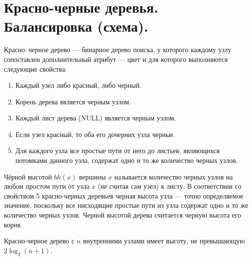 \section{Красно-черные деревья. Балансировка (схема).}

\begin{definition}
    Красно–черное дерево --- бинарное дерево поиска, у которого каждому узлу сопоставлен дополнительный атрибут --- цвет и для которого выполняются следующие свойства:

    \begin{enumerate}
        \item Каждый узел либо красный, либо черный.
        \item Корень дерева является черным узлом.
        \item Каждый лист дерева (NULL) является черным узлом.
        \item Если узел красный, то оба его дочерних узла черные.
        \item Для каждого узла все простые пути от него до листьев, являющихся потомками данного узла, содержат одно и то же количество черных узлов.
    \end{enumerate}
\end{definition}


\begin{definition}
    Чёрной высотой $bh(x)$ вершины $x$ называется количество черных узлов на любом простом пути от узла $x$ (не считая сам узел) к листу. В соответствии со свойством 5 красно-черных деревьев черная высота узла --- точно определяемое значение, поскольку все нисходящие простые пути из узла содержат одно и то же количество черных узлов.
    Черной высотой дерева считается черную высота его корня.
\end{definition}

\begin{lemma}
Красно-черное дерево с $n$ внутренними узлами имеет высоту, не превышающую $2 \log_2(n + 1)$.
\end{lemma}

